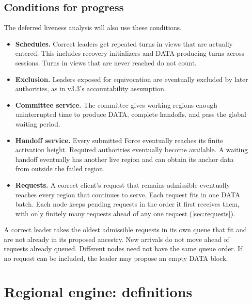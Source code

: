 \documentclass[11pt,a4paper]{article}
\begin{document}
\subsection{Conditions for progress}
\label{sec:progress}
The deferred liveness analysis will also use these conditions.
\begin{itemize}
\item \textbf{Schedules.} Correct leaders get repeated turns in views
that are actually entered. This includes recovery initializers and
DATA-producing turns across sessions. Turns in views that are never
reached do not count. 
\item \textbf{Exclusion.} Leaders exposed for equivocation are eventually
excluded by later authorities, as in v3.3's accountability assumption.
\item \textbf{Committee service.} The committee gives working regions
enough uninterrupted time to produce DATA, complete handoffs, and pass
the global waiting period.
\item \textbf{Handoff service.} Every submitted Force eventually reaches
its finite activation height. Required authorities eventually become
available. A waiting handoff eventually has another live region and
can obtain its anchor data from outside the failed region.
\item \textbf{Requests.} A correct client's request that remains
admissible eventually reaches every region that continues to serve.
Each request fits in one DATA batch. Each node keeps pending requests
in the order it first receives them, with only finitely many requests
ahead of any one request (\cref{sec:requests}).
\end{itemize}
A correct leader takes the oldest admissible requests in its own queue
that fit and are not already in its proposed ancestry. New arrivals do
not move ahead of requests already queued. Different nodes need not
have the same queue order. If no request can be included, the leader
may propose an empty DATA block.

\section{Regional engine: definitions}
\label{sec:regional}
\end{document}
